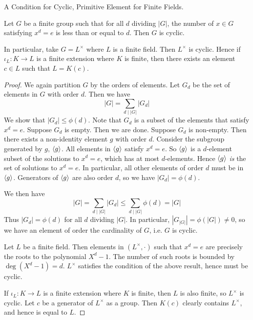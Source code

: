 \documentclass[../book.tex]{subfiles}
\begin{document}
\begin{thm} A Condition for Cyclic, Primitive Element for Finite Fields.
    
    Let $G$ be a finite group such that for all $d$ dividing $|G|$, 
    the number of $x \in G$ satisfying $x^d = e$ is less than or equal to $d$. 
    Then $G$ is cyclic.
    
    In particular, take $G = L^\times$ where $L$ is a finite field.
    Then $L^\times$ is cyclic. 
    Hence if $\iota_L : K \to L$ is a finite extension where $K$ is finite,
    then there exists an element $c \in L$ such that $L = K(c)$.
\end{thm}
\begin{proof}
    
    We again partition $G$ by the orders of elements. 
    Let $G_d$ be the set of elements in $G$ with order $d$. 
    Then we have \[
        |G| = \sum_{d \mid |G|} |G_d|
    \]
    We show that $|G_d| \leq \phi(d)$. 
    Note that $G_d$ is a subset of the elements that satisfy $x^d = e$. 
    Suppose $G_d$ is empty. Then we are done.
    Suppose $G_d$ is non-empty. 
    Then there exists a non-identity element $g$ with order $d$.
    Consider the subgroup generated by $g$, $\langle g\rangle$. 
    All elements in $\langle g\rangle$ satisfy $x^d = e$.
    So $\langle g\rangle$ is a $d$-element subset of the solutions to $x^d = e$,
    which has at most $d$-elements.
    Hence $\langle g\rangle$ \emph{is} the set of solutions to $x^d = e$.
    In particular, all other elements of order $d$ must be in $\langle g\rangle$.
    Generators of $\langle g\rangle$ are also order $d$, so we have $|G_d| = \phi(d)$. 
    
    We then have \[
        |G| = \sum_{d \mid |G|} |G_d| \leq \sum_{d \mid |G|} \phi(d) = |G|
    \]
    Thus $|G_d| = \phi(d)$ for all $d$ dividing $|G|$. 
    In particular, $|G_{|G|}| = \phi(|G|) \neq 0$, 
    so we have an element of order the cardinality of $G$,
    i.e. $G$ is cyclic.
    
    Let $L$ be a finite field. 
    Then elements in $(L^\times,\cdot)$ such that $x^d = e$ are precisely 
    the roots to the polynomial $X^d - 1$.
    The number of such roots is bounded by $\deg (X^d - 1) = d$. 
    $L^\times$ satisfies the condition of the above result, hence must be cyclic.
    
    If $\iota_L : K \to L$ is a finite extension where $K$ is finite,
    then $L$ is also finite, so $L^\times$ is cyclic.
    Let $c$ be a generator of $L^\times$ as a group. 
    Then $K(c)$ clearly contains $L^\times$, and hence is equal to $L$. 
\end{proof}
\end{document}
